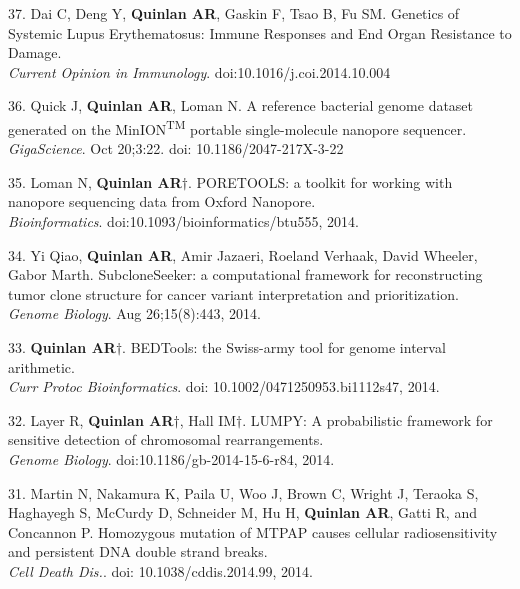 \documentclass[margin,line]{cv}
\begin{document}
\begin{resume}
\begin{list}{*}{}
    \item[37.] Dai C, Deng Y, \textbf{Quinlan AR}, Gaskin F, Tsao B, Fu SM.
    Genetics of Systemic Lupus Erythematosus: Immune Responses and End Organ Resistance to Damage.\\
    \emph{Current Opinion in Immunology}. doi:10.1016/j.coi.2014.10.004

    \item[36.] Quick J, \textbf{Quinlan AR}, Loman N.
    A reference bacterial genome dataset generated on the MinION\textsuperscript{TM} portable single-molecule nanopore sequencer.\\
    \emph{GigaScience}. Oct 20;3:22. doi: 10.1186/2047-217X-3-22

    \item[35.] Loman N, \textbf{Quinlan AR}$\dagger$.
    PORETOOLS: a toolkit for working with nanopore sequencing data from Oxford Nanopore.\\
    \emph{Bioinformatics}. doi:10.1093/bioinformatics/btu555, 2014.

    \item[34.] Yi Qiao, \textbf{Quinlan AR}, Amir Jazaeri, Roeland Verhaak, David Wheeler, Gabor Marth.
    SubcloneSeeker: a computational framework for reconstructing tumor clone structure for cancer variant interpretation and prioritization.\\
    \emph{Genome Biology}. Aug 26;15(8):443, 2014.

    \item[33.] \textbf{Quinlan AR}$\dagger$.
    BEDTools: the Swiss-army tool for genome interval arithmetic.\\
    \emph{Curr Protoc Bioinformatics}. doi: 10.1002/0471250953.bi1112s47, 2014.

    \item[32.] Layer R, \textbf{Quinlan AR}$\dagger$, Hall IM$\dagger$.
    LUMPY: A probabilistic framework for sensitive detection of chromosomal rearrangements.\\
    \emph{Genome Biology}. doi:10.1186/gb-2014-15-6-r84, 2014.

    \item[31.] Martin N, Nakamura K, Paila U, Woo J, Brown C, Wright J, Teraoka S, Haghayegh S, McCurdy D, Schneider M, Hu H, \textbf{Quinlan AR}, Gatti R, and Concannon P.
    Homozygous mutation of MTPAP causes cellular radiosensitivity and persistent DNA double strand breaks.\\
    \emph{Cell Death Dis.}. doi: 10.1038/cddis.2014.99, 2014.


\end{list}
\end{resume}
\end{document}
